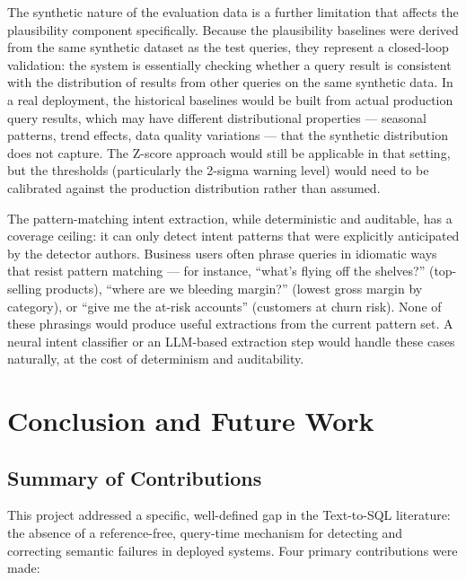 \documentclass[12pt,a4paper]{report}
\begin{document}
The synthetic nature of the evaluation data is a further limitation that affects the plausibility component specifically. Because the plausibility baselines were derived from the same synthetic dataset as the test queries, they represent a closed-loop validation: the system is essentially checking whether a query result is consistent with the distribution of results from other queries on the same synthetic data. In a real deployment, the historical baselines would be built from actual production query results, which may have different distributional properties — seasonal patterns, trend effects, data quality variations — that the synthetic distribution does not capture. The Z-score approach would still be applicable in that setting, but the thresholds (particularly the 2-sigma warning level) would need to be calibrated against the production distribution rather than assumed.

The pattern-matching intent extraction, while deterministic and auditable, has a coverage ceiling: it can only detect intent patterns that were explicitly anticipated by the detector authors. Business users often phrase queries in idiomatic ways that resist pattern matching — for instance, ``what's flying off the shelves?'' (top-selling products), ``where are we bleeding margin?'' (lowest gross margin by category), or ``give me the at-risk accounts'' (customers at churn risk). None of these phrasings would produce useful extractions from the current pattern set. A neural intent classifier or an LLM-based extraction step would handle these cases naturally, at the cost of determinism and auditability.

\chapter{Conclusion and Future Work}
\label{ch:conclusion}

\section{Summary of Contributions}
\label{sec:contributions}

This project addressed a specific, well-defined gap in the Text-to-SQL literature: the absence of a reference-free, query-time mechanism for detecting and correcting semantic failures in deployed systems. Four primary contributions were made:
\end{document}
